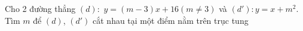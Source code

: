 \begin{bt}	
	Cho 2 đường thẳng $(d)\colon$ $y=\left(m-3\right)x+16\left(m\ne 3\right)$ và $(d')\colon y=x+m^2$. Tìm $m$ để $(d)$, $(d')$ cắt nhau tại một điểm nằm trên trục tung
\end{bt}
 
